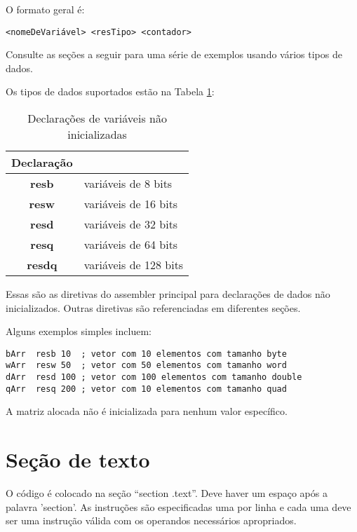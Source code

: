 O formato geral é:
\begin{verbatim}
<nomeDeVariável> <resTipo> <contador>
\end{verbatim}

Consulte as seções a seguir para uma série de exemplos usando vários tipos de dados.

Os tipos de dados suportados estão na Tabela \ref{tabDadosNInicializados}:

{\centering
\begin{table}[ht]
	\centering
	\begin{tabular}{|c|l|}
		\hline
		\rowcolor[HTML]{C0C0C0} 
		{\color[HTML]{000000} } Declaração & {\color[HTML]{000000} } \\ \hline
		\textbf{resb}& variáveis de 8 bits \\ \hline
		\textbf{resw} & variáveis de 16 bits\\ \hline
		\textbf{resd} & variáveis de 32 bits\\ \hline
		\textbf{resq} & variáveis de 64 bits\\ \hline
		\textbf{resdq} & variáveis de 128 bits \\ \hline
	\end{tabular}
    \caption{Declarações de variáveis não inicializadas}
    \label{tabDadosNInicializados}
\end{table}
} 

Essas são as diretivas do assembler principal para declarações de dados não inicializados. Outras diretivas são referenciadas em diferentes seções.

Alguns exemplos simples incluem:

\begin{verbatim}
bArr  resb 10  ; vetor com 10 elementos com tamanho byte
wArr  resw 50  ; vetor com 50 elementos com tamanho word
dArr  resd 100 ; vetor com 100 elementos com tamanho double
qArr  resq 200 ; vetor com 10 elementos com tamanho quad
\end{verbatim}

A matriz alocada não é inicializada para nenhum valor específico.

\section{Seção de texto}
O código é colocado na seção ``section .text''. Deve haver um espaço após a palavra 'section'. As instruções são especificadas uma por linha e cada uma deve ser uma instrução válida com os operandos necessários apropriados.

